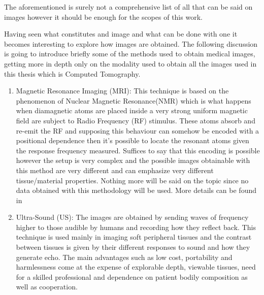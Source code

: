 The aforementioned is surely not a comprehensive list of all that can be said on images however it should be enough for the scopes of this work.

\vspace{7mm} %

Having seen what constitutes and image and what can be done with one it becomes interesting to explore how images are obtained. The following discussion is going to introduce briefly some of the methods used to obtain medical images, getting more in depth only on the modality used to obtain all the images used in this thesis which is Computed Tomography.

\begin{enumerate}
\item Magnetic Resonance Imaging (MRI): This technique is based on the phenomenon of Nuclear Magnetic Resonance(NMR) which is what happens when diamagnetic atoms are placed inside a very strong uniform magnetic field are subject to Radio Frequency (RF) stimulus. These atoms absorb and re-emit the RF and supposing this behaviour can somehow be encoded with a positional dependence then it's possible to locate the resonant atoms given the response frequency measured. Suffices to say that this encoding is possible however the setup is very complex and the possible images obtainable with this method are very different and can emphasize very different tissue/material properties. Nothing more will be said on the topic since no data obtained with this methodology will be used. More details can be found in \cite{MRI}
\item Ultra-Sound (US): The images are obtained by sending waves of frequency higher to those audible by humans and recording how they reflect back. This technique is used mainly in imaging soft peripheral tissues and the contrast between tissues is given by their different responses to sound and how they generate echo. The main advantages such as low cost, portability and harmlessness come at the expense of explorable depth, viewable tissues, need for a skilled professional and dependence on patient bodily composition as well as cooperation.

\end{enumerate}

